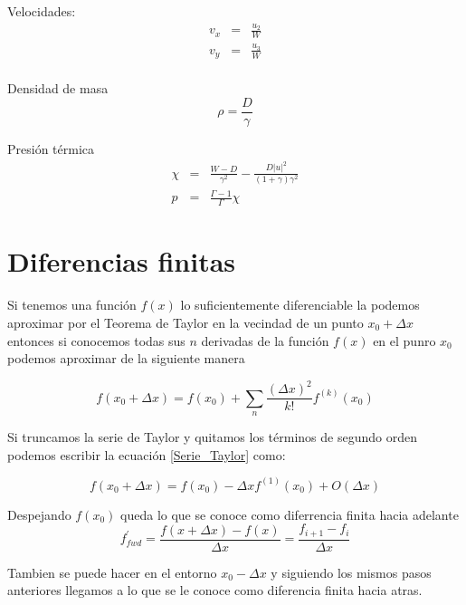 \documentclass[12pt,a4paper]{book}
\providecommand{\abs}[1]{\lvert#1\rvert} %
\begin{document}
Velocidades:
\begin{eqnarray}
v_{x}&=&\frac{u_{2}}{W}\\
v_{y}&=&\frac{u_{3}}{W}\\
\end{eqnarray}

Densidad de masa 
\begin{equation}
\rho=\frac{D}{\gamma}
\end{equation}

Presión térmica
\begin{eqnarray}
\chi&=&\frac{W-D}{\gamma^{2}}-\frac{D \abs{u}^{2}}{(1+\gamma)\gamma^{2}}\\
p&=&\frac{\Gamma-1}{\Gamma} \chi
\end{eqnarray}



\section{Diferencias finitas} \label{sec:Diferencias_finitas}
Si tenemos una función $f(x)$ lo suficientemente diferenciable la podemos aproximar por el Teorema de Taylor  en la vecindad de un punto $x_0+\Delta x$ entonces si conocemos todas sus $n$ derivadas de la función $f(x)$ en el punro $x_0$ podemos aproximar de la siguiente manera

\begin{equation}\label{Serie_Taylor}
f\left( x_0 + \Delta x\right) = f\left( x_0 \right)+
\sum_n \frac{\left( \Delta x \right) ^2}{k!}f^{(k)} \left(x_0
\right)
\end{equation}

Si truncamos la serie de Taylor y quitamos los términos de segundo orden podemos escribir la ecuación \ref{Serie_Taylor} como:

\begin{equation}
f\left( x_0 + \Delta x \right) = f(x_0) - \Delta x f^{(1)} (x_0) + O \left( \Delta x \right)
\end{equation}

Despejando $f(x_0)$ queda lo que se conoce como diferrencia finita hacia adelante
\begin{equation}\label{fwd}
f_{fwd}^{'}=\frac{f\left(x + \Delta x \right) - f(x) }{\Delta x}=\frac{f_{i+1}-f_{i}}{\Delta x}
\end{equation}

Tambien se puede hacer en el entorno $x_0- \Delta x$ y siguiendo los mismos pasos anteriores llegamos a lo que se le conoce como diferencia finita hacia atras.
\end{document}
